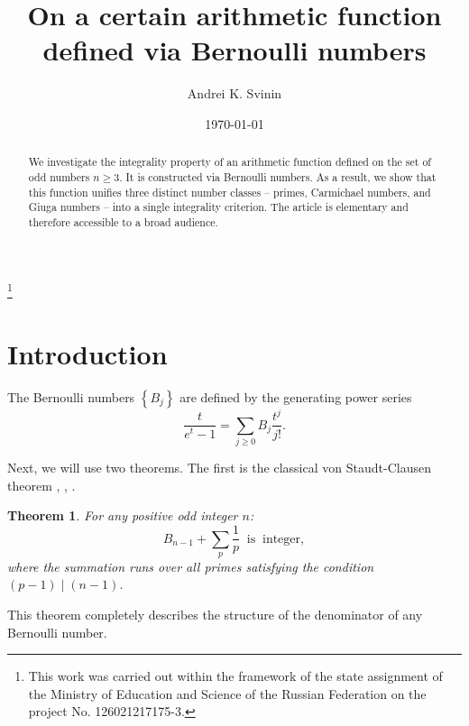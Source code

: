 \documentclass[reqno,a4paper,11pt]{amsart}
\numberwithin{equation}{section}
\newtheorem{theorem}{Theorem}[section]
\theoremstyle{definition}
\begin{document}
\parskip 4pt
\baselineskip 16pt


\title[On a certain arithmetic function defined via Bernoulli numbers]
{On a certain arithmetic function defined via Bernoulli numbers}

\author[Andrei K. Svinin]{Andrei K. Svinin}
\address{Andrei K. Svinin, 
Matrosov Institute for System Dynamics and Control Theory of 
Siberian Branch of Russian Academy of Sciences,
P.O. Box 292, 664033 Irkutsk, Russia}




\thanks{This work was carried out within the framework of  the state assignment of the Ministry of Education
and Science of the Russian Federation on the project No.  126021217175-3.
}



\date{\today}




\begin{abstract}
We investigate the integrality property of an arithmetic function defined on the set of odd numbers $n\geq 3$. It is constructed via Bernoulli numbers. As a result, we show that this function unifies three distinct number classes -- primes, Carmichael numbers, and Giuga numbers -- into a single integrality criterion. The article is elementary and therefore accessible to a broad audience.
\end{abstract}


\maketitle

\section*{Introduction}

The Bernoulli numbers $\left\{B_j\right\}$  are defined by the generating power series
\[
\frac{t}{e^t-1}=\sum_{j\geq 0} B_j\frac{t^j}{j !}.
\]

Next, we will use two theorems. The first is the classical von Staudt-Clausen theorem \cite{Clausen}, \cite{Hardy}, \cite{Staudt}.
\begin{theorem}
For any positive odd integer $n$:
\[
B_{n-1}+\sum_{p}\frac{1}{p}\;\;\mbox{is}\;\; \mbox{integer},
\]
where the summation runs over all primes  satisfying the condition $(p-1)\mid (n-1)$. 
\end{theorem}
This theorem completely describes the structure of the denominator of any Bernoulli number. 
\end{document}
